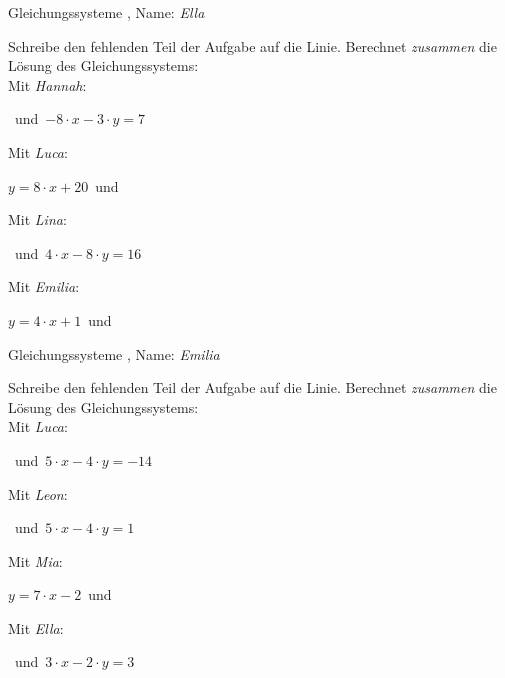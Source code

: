 \newpage
\begin{center}\large Gleichungssysteme
, Name: \emph{Ella}\end{center}
Schreibe den fehlenden Teil der Aufgabe auf die Linie. Berechnet \emph{zusammen} die Lösung des Gleichungssystems:
\\
\vfill Mit \emph{Hannah}:
\begin{center}\underline{}
\mbox{ }und\mbox{ }$-8\cdot x-3\cdot y=7$\end{center}
\vfill Mit \emph{Luca}:
\begin{center}$y=8\cdot x+20$\mbox{ }und\mbox{ }
\underline{}\end{center}
\vfill Mit \emph{Lina}:
\begin{center}\underline{}
\mbox{ }und\mbox{ }$4\cdot x-8\cdot y=16$\end{center}
\vfill Mit \emph{Emilia}:
\begin{center}$y=4\cdot x+1$\mbox{ }und\mbox{ }
\underline{}\end{center}
\newpage
\begin{center}\large Gleichungssysteme
, Name: \emph{Emilia}\end{center}
Schreibe den fehlenden Teil der Aufgabe auf die Linie. Berechnet \emph{zusammen} die Lösung des Gleichungssystems:
\\
\vfill Mit \emph{Luca}:
\begin{center}\underline{}
\mbox{ }und\mbox{ }$5\cdot x-4\cdot y=-14$\end{center}
\vfill Mit \emph{Leon}:
\begin{center}\underline{}
\mbox{ }und\mbox{ }$5\cdot x-4\cdot y=1$\end{center}
\vfill Mit \emph{Mia}:
\begin{center}$y=7\cdot x-2$\mbox{ }und\mbox{ }
\underline{}\end{center}
\vfill Mit \emph{Ella}:
\begin{center}\underline{}
\mbox{ }und\mbox{ }$3\cdot x-2\cdot y=3$\end{center}
